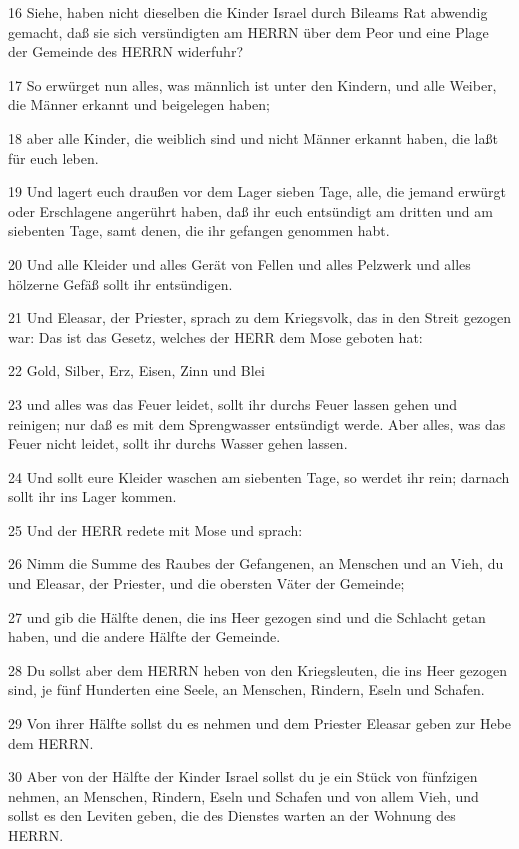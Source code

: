 \par 16 Siehe, haben nicht dieselben die Kinder Israel durch Bileams Rat abwendig gemacht, daß sie sich versündigten am HERRN über dem Peor und eine Plage der Gemeinde des HERRN widerfuhr?
\par 17 So erwürget nun alles, was männlich ist unter den Kindern, und alle Weiber, die Männer erkannt und beigelegen haben;
\par 18 aber alle Kinder, die weiblich sind und nicht Männer erkannt haben, die laßt für euch leben.
\par 19 Und lagert euch draußen vor dem Lager sieben Tage, alle, die jemand erwürgt oder Erschlagene angerührt haben, daß ihr euch entsündigt am dritten und am siebenten Tage, samt denen, die ihr gefangen genommen habt.
\par 20 Und alle Kleider und alles Gerät von Fellen und alles Pelzwerk und alles hölzerne Gefäß sollt ihr entsündigen.
\par 21 Und Eleasar, der Priester, sprach zu dem Kriegsvolk, das in den Streit gezogen war: Das ist das Gesetz, welches der HERR dem Mose geboten hat:
\par 22 Gold, Silber, Erz, Eisen, Zinn und Blei
\par 23 und alles was das Feuer leidet, sollt ihr durchs Feuer lassen gehen und reinigen; nur daß es mit dem Sprengwasser entsündigt werde. Aber alles, was das Feuer nicht leidet, sollt ihr durchs Wasser gehen lassen.
\par 24 Und sollt eure Kleider waschen am siebenten Tage, so werdet ihr rein; darnach sollt ihr ins Lager kommen.
\par 25 Und der HERR redete mit Mose und sprach:
\par 26 Nimm die Summe des Raubes der Gefangenen, an Menschen und an Vieh, du und Eleasar, der Priester, und die obersten Väter der Gemeinde;
\par 27 und gib die Hälfte denen, die ins Heer gezogen sind und die Schlacht getan haben, und die andere Hälfte der Gemeinde.
\par 28 Du sollst aber dem HERRN heben von den Kriegsleuten, die ins Heer gezogen sind, je fünf Hunderten eine Seele, an Menschen, Rindern, Eseln und Schafen.
\par 29 Von ihrer Hälfte sollst du es nehmen und dem Priester Eleasar geben zur Hebe dem HERRN.
\par 30 Aber von der Hälfte der Kinder Israel sollst du je ein Stück von fünfzigen nehmen, an Menschen, Rindern, Eseln und Schafen und von allem Vieh, und sollst es den Leviten geben, die des Dienstes warten an der Wohnung des HERRN.
